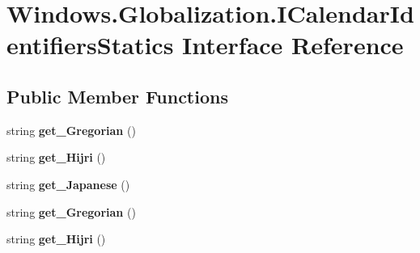 \hypertarget{interface_windows_1_1_globalization_1_1_i_calendar_identifiers_statics}{}\section{Windows.\+Globalization.\+I\+Calendar\+Identifiers\+Statics Interface Reference}
\label{interface_windows_1_1_globalization_1_1_i_calendar_identifiers_statics}
\subsection*{Public Member Functions}
\begin{DoxyCompactItemize}
\item 
\mbox{\label{interface_windows_1_1_globalization_1_1_i_calendar_identifiers_statics_af0c993ad0da3117055c97188db9cb890}} 
string {\bfseries get\+\_\+\+Gregorian} ()
\item 
\mbox{\label{interface_windows_1_1_globalization_1_1_i_calendar_identifiers_statics_a9decad6209b55da871f6a8faea25e34e}} 
string {\bfseries get\+\_\+\+Hijri} ()
\item 
\mbox{\label{interface_windows_1_1_globalization_1_1_i_calendar_identifiers_statics_a6196ccc385fdb253c76948bf0ca8614d}} 
string {\bfseries get\+\_\+\+Japanese} ()
\item 
\mbox{\label{interface_windows_1_1_globalization_1_1_i_calendar_identifiers_statics_af0c993ad0da3117055c97188db9cb890}} 
string {\bfseries get\+\_\+\+Gregorian} ()
\item 
\mbox{\label{interface_windows_1_1_globalization_1_1_i_calendar_identifiers_statics_a9decad6209b55da871f6a8faea25e34e}} 
string {\bfseries get\+\_\+\+Hijri} ()
\item 
\mbox{\label{interface_windows_1_1_globalization_1_1_i_calendar_identifiers_statics_a6196ccc385fdb253c76948bf0ca8614d}} 

\end{DoxyCompactItemize}
